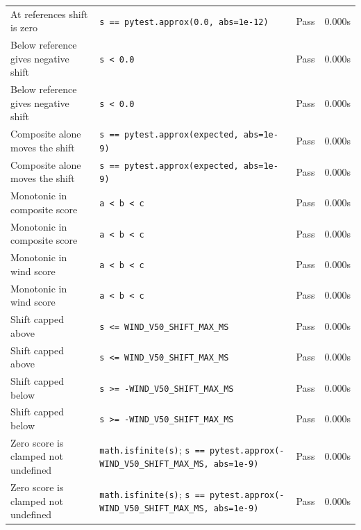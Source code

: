 \documentclass[11pt,a4paper]{article}
\begin{document}
\begin{longtable}{p{6cm}p{5.5cm}cc}
    At references shift is zero & {\scriptsize \texttt{s == pytest.approx(0.0, abs=1e-12)}} & \textcolor{green!60!black}{Pass} & 0.000s \\
    Below reference gives negative shift & {\scriptsize \texttt{s < 0.0}} & \textcolor{green!60!black}{Pass} & 0.000s \\
    Below reference gives negative shift & {\scriptsize \texttt{s < 0.0}} & \textcolor{green!60!black}{Pass} & 0.000s \\
    Composite alone moves the shift & {\scriptsize \texttt{s == pytest.approx(expected, abs=1e-9)}} & \textcolor{green!60!black}{Pass} & 0.000s \\
    Composite alone moves the shift & {\scriptsize \texttt{s == pytest.approx(expected, abs=1e-9)}} & \textcolor{green!60!black}{Pass} & 0.000s \\
    Monotonic in composite score & {\scriptsize \texttt{a < b < c}} & \textcolor{green!60!black}{Pass} & 0.000s \\
    Monotonic in composite score & {\scriptsize \texttt{a < b < c}} & \textcolor{green!60!black}{Pass} & 0.000s \\
    Monotonic in wind score & {\scriptsize \texttt{a < b < c}} & \textcolor{green!60!black}{Pass} & 0.000s \\
    Monotonic in wind score & {\scriptsize \texttt{a < b < c}} & \textcolor{green!60!black}{Pass} & 0.000s \\
    Shift capped above & {\scriptsize \texttt{s <= WIND\_V50\_SHIFT\_MAX\_MS}} & \textcolor{green!60!black}{Pass} & 0.000s \\
    Shift capped above & {\scriptsize \texttt{s <= WIND\_V50\_SHIFT\_MAX\_MS}} & \textcolor{green!60!black}{Pass} & 0.000s \\
    Shift capped below & {\scriptsize \texttt{s >= -WIND\_V50\_SHIFT\_MAX\_MS}} & \textcolor{green!60!black}{Pass} & 0.000s \\
    Shift capped below & {\scriptsize \texttt{s >= -WIND\_V50\_SHIFT\_MAX\_MS}} & \textcolor{green!60!black}{Pass} & 0.000s \\
    Zero score is clamped not undefined & {\scriptsize \texttt{math.isfinite(s)}; \texttt{s == pytest.approx(-WIND\_V50\_SHIFT\_MAX\_MS, abs=1e-9)}} & \textcolor{green!60!black}{Pass} & 0.000s \\
    Zero score is clamped not undefined & {\scriptsize \texttt{math.isfinite(s)}; \texttt{s == pytest.approx(-WIND\_V50\_SHIFT\_MAX\_MS, abs=1e-9)}} & \textcolor{green!60!black}{Pass} & 0.000s \\

\end{longtable}
\end{document}

